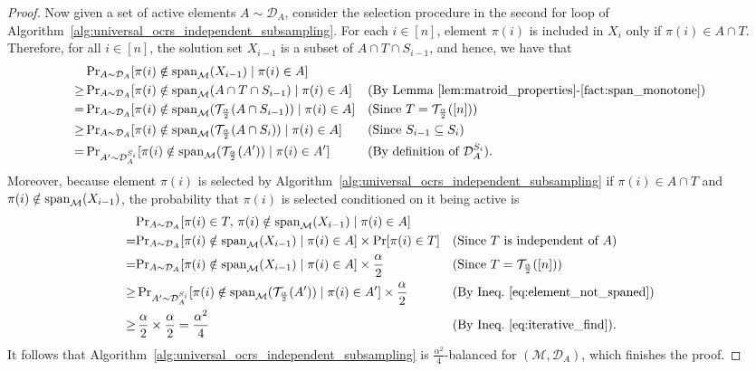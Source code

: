 \documentclass[11pt]{article}
\newcommand{\D}{\mathcal D}
\newcommand{\M}{{\mathcal M}}
\newcommand{\T}{{\mathcal T}}
\newcommand{\spa}{\textnormal{span}}
\begin{document}
\begin{proof}
Now given a set of active elements $A\sim\D_A$, consider the selection procedure in the second for loop of Algorithm~\ref{alg:universal_ocrs_independent_subsampling}. For each $i\in[n]$, element $\pi(i)$ is included in $X_i$ only if $\pi(i)\in A\cap T$. Therefore, for all $i\in[n]$, the solution set $X_{i-1}$ is a subset of $A\cap T\cap S_{i-1}$, and hence, we have that
\begin{align}
&\,{\Pr}_{A\sim \D_A}[\pi(i)\notin \spa_{\M}(X_{i-1})\mid \pi(i)\in A]\nonumber\\
\ge&\,{\Pr}_{A\sim \D_A}[\pi(i)\notin \spa_{\M}(A\cap T\cap S_{i-1})\mid \pi(i)\in A]&&\text{(By Lemma~\ref{lem:matroid_properties}-\ref{fact:span_monotone})}\nonumber\\
=&\,{\Pr}_{A\sim \D_A}[\pi(i)\notin \spa_{\M}(\T_{\frac{\alpha}{2}}(A\cap S_{i-1}))\mid \pi(i)\in A]&&\text{(Since $T=\T_{\frac{\alpha}{2}}([n])$)}\nonumber\\
\ge&\,{\Pr}_{A\sim \D_A}[\pi(i)\notin \spa_{\M}(\T_{\frac{\alpha}{2}}(A\cap S_{i}))\mid \pi(i)\in A]&&\text{(Since $S_{i-1}\subseteq S_{i}$)}\nonumber\\
=&\,{\Pr}_{A'\sim \D_A^{S_i}}[\pi(i)\notin \spa_{\M}(\T_{\frac{\alpha}{2}}(A'))\mid \pi(i)\in A']&&\text{(By definition of $\D_A^{S_i}$)}.\label{eq:element_not_spaned}
\end{align}
Moreover, because element $\pi(i)$ is selected by Algorithm~\ref{alg:universal_ocrs_independent_subsampling} if $\pi(i)\in A\cap T$ and $\pi(i)\notin \spa_{\M}(X_{i-1})$, the probability that $\pi(i)$ is selected conditioned on it being active is 
\begin{align}
&{\Pr}_{A\sim \D_A}[\pi(i)\in T,\,\pi(i)\notin \spa_{\M}(X_{i-1})\mid \pi(i)\in A]\nonumber\\
=&{\Pr}_{A\sim \D_A}[\pi(i)\notin \spa_{\M}(X_{i-1})\mid \pi(i)\in A]\times\Pr[\pi(i)\in T] &&\text{(Since $T$ is independent of $A$)}\nonumber\\
=&{\Pr}_{A\sim \D_A}[\pi(i)\notin \spa_{\M}(X_{i-1})\mid \pi(i)\in A]\times\frac{\alpha}{2}&&\text{(Since $T=\T_{\frac{\alpha}{2}}([n])$)}\nonumber\\
\ge&\,{\Pr}_{A'\sim \D_A^{S_i}}[\pi(i)\notin \spa_{\M}(\T_{\frac{\alpha}{2}}(A'))\mid \pi(i)\in A']\times\frac{\alpha}{2} &&\text{(By Ineq.~\eqref{eq:element_not_spaned})}\label{eq:probability_of_selection} \\
\ge&\,\frac{\alpha}{2}\times\frac{\alpha}{2}=\frac{\alpha^2}{4} &&\text{(By Ineq.~\eqref{eq:iterative_find})}.\nonumber
\end{align}
It follows that Algorithm~\ref{alg:universal_ocrs_independent_subsampling} is $\frac{\alpha^2}{4}$-balanced for $(\M,\D_A)$, which finishes the proof.
\end{proof}
\end{document}
